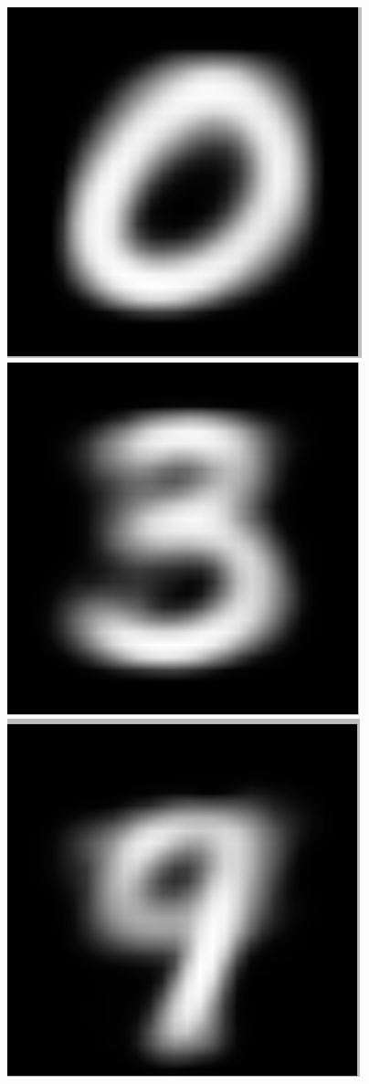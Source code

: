 \documentclass[submit]{harvardml}
\begin{document}
\begin{figure}[h]
		\includegraphics[scale=0.1]{./m5/3}
		\includegraphics[scale=0.1]{./m5/4}
		\includegraphics[scale=0.1]{./m5/5}

\end{figure}
\end{document}
